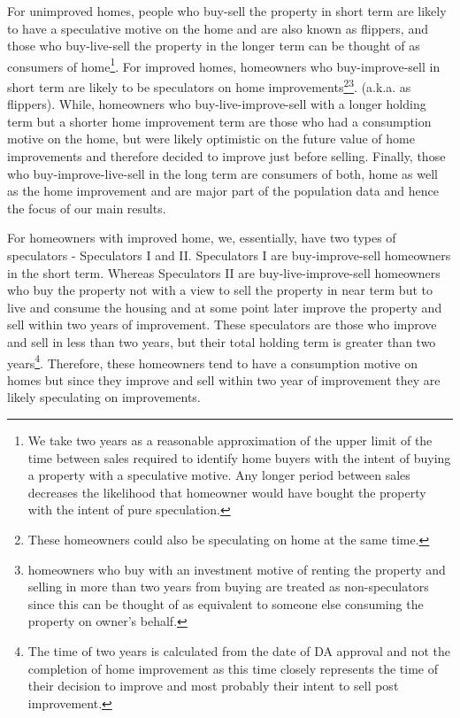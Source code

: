\documentclass[AEJ,reqno, draftmode]{AEA} %
\begin{document}
For unimproved homes, people who buy-sell the property in short term are likely to have a speculative motive on the home and are also known as flippers, and those who buy-live-sell the property in the longer term can be thought of as consumers of home\footnote{We take two years as a reasonable approximation of the upper limit of the time between sales required to identify home buyers with the intent of buying a property with a speculative motive. Any longer period between sales decreases the likelihood that homeowner would have bought the property with the intent of pure speculation.}. For improved homes, homeowners who buy-improve-sell in short term are likely to be speculators on home improvements\footnote{These homeowners could also be speculating on home at the same time.}\footnote{homeowners who buy with an investment motive of renting the property and selling in more than two years from buying are treated as non-speculators since this can be thought of as equivalent to someone else consuming the property on owner's behalf.}. (a.k.a. as flippers). While, homeowners who buy-live-improve-sell with a longer holding term but a shorter home improvement term are those who had a consumption motive on the home, but were likely optimistic on the future value of home improvements and therefore decided to improve just before selling. Finally, those who buy-improve-live-sell in the long term are consumers of both, home as well as the home improvement and are major part of the population data and hence the focus of our main results.

For homeowners with improved home, we, essentially, have two types of speculators - Speculators I and II. Speculators I are buy-improve-sell homeowners in the short term. Whereas Speculators II are buy-live-improve-sell homeowners who buy the property not with a view to sell the property in near term but to live and consume the housing and at some point later improve the property and sell within two years of improvement. These speculators are those who improve and sell in less than two years, but their total holding term is greater than two years\footnote{The time of two years is calculated from the date of DA approval and not the completion of home improvement as this time closely represents the time of their decision to improve and most probably their intent to sell post improvement.}. Therefore, these homeowners tend to have a consumption motive on homes but since they improve and sell within two year of improvement they are likely speculating on improvements.
\end{document}
